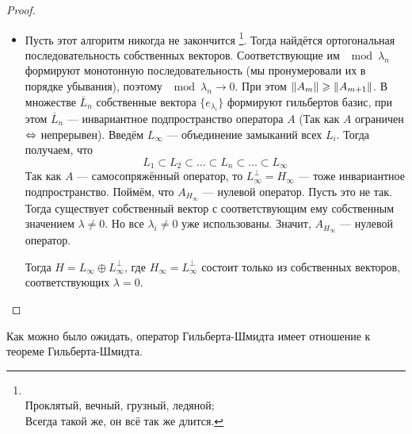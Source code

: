 \documentclass[12pt]{article}
\begin{document}
\begin{proof}
\begin{itemize}
			\item Пусть этот алгоритм никогда не закончится
				\footnote
				{
					\\
					Проклятый, вечный, грузный, ледяной; \\
					Всегда такой же, он всё так же длится.
				}.
				Тогда найдётся ортогональная последовательность собственных векторов. Соответствующие им $\mod{\lambda_n}$ 
				формируют монотонную последовательность {\color{gray}(мы пронумеровали их в порядке убывания)}, поэтому 
				$\mod{\lambda_n} \rightarrow 0$. При этом 
				$\left\| A_m \right\| \geqslant \left\| A_{m+1} \right\|$. В множестве $\overline{L}_n$ собственные вектора $\{e_{\lambda_i}\}$ 
				формируют гильбертов базис, при этом $\overline{L}_n$ --- инвариантное подпространство оператора
				$A$ (Так как $A$ ограничен $\Leftrightarrow$ непрерывен). Введём $L_{\infty}$ --- объединение 
				замыканий всех $L_i$. Тогда получаем, что
				$$L_1 \subset L_2 \subset \dots \subset L_n \subset \dots \subset L_{\infty}$$
				Так как $A$ --- самосопряжённый оператор, то $L^{\perp}_{\infty} = H_{\infty}$ --- тоже инвариантное 
				подпространство. Поймём, что $A_{H_{\infty}}$ --- нулевой оператор. Пусть это не так. Тогда существует
				собственный вектор с соответствующим ему собственным значением $\lambda \neq 0$. Но все
				$\lambda_i \neq 0$ уже использованы. Значит, $A_{H_{\infty}}$ --- нулевой оператор.
			
				Тогда $H = L_{\infty} \oplus L^{\perp}_{\infty}$, где $H_{\infty} = L^{\perp}_{\infty}$ состоит только
				из собственных векторов, соответствующих $\lambda = 0$.
			\end{itemize}
		\end{proof}
	
		Как можно было ожидать, оператор Гильберта-Шмидта имеет отношение к теореме Гильберта-Шмидта.
	
\end{document}
